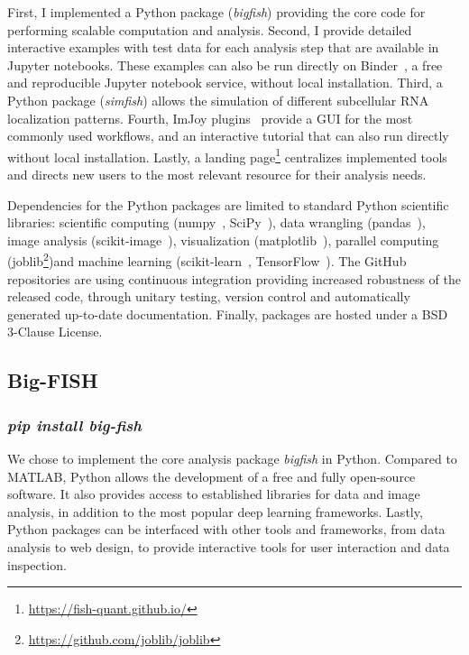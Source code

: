 First, I implemented a Python package (\emph{bigfish}) providing the core code for performing scalable computation and analysis.
Second, I provide detailed interactive examples with test data for each analysis step that are available in Jupyter notebooks.
These examples can also be run directly on Binder~\cite{Jupyter2018Binder2}, a free and reproducible Jupyter notebook service, without local installation.
Third, a Python package (\emph{simfish}) allows the simulation of different subcellular \ac{RNA} localization patterns.
Fourth, ImJoy plugins~\cite{ouyang_imjoy_2019} provide a \ac{GUI} for the most commonly used workflows, and an interactive tutorial that can also run directly without local installation.
Lastly, a landing page\footnote{\url{https://fish-quant.github.io/}} centralizes implemented tools and directs new users to the most relevant resource for their analysis needs.

Dependencies for the Python packages are limited to standard Python scientific libraries: scientific computing (numpy~\cite{2020NumPy}, SciPy~\cite{2020SciPy}), data wrangling (pandas~\cite{mckinney_pandas_2010}), image analysis (scikit-image~\cite{walt_scikit-image_2014}), visualization (matplotlib~\cite{hunter_matplotlib_2007}), parallel computing (joblib\footnote{\url{https://github.com/joblib/joblib}})and machine learning (scikit-learn~\cite{pedregosa11a_scikitlearn}, TensorFlow~\cite{tensorflow_2015}).
The GitHub repositories are using continuous integration providing increased robustness of the released code, through unitary testing, version control and automatically generated up-to-date documentation.
Finally, packages are hosted under a BSD 3-Clause License.

\subsection{Big-FISH}
\label{subsec:bigfish}

\subsubsection{\emph{pip install big-fish}}

We chose to implement the core analysis package \emph{bigfish} in Python.
Compared to MATLAB, Python allows the development of a free and fully open-source software.
It also provides access to established libraries for data and image analysis, in addition to the most popular deep learning frameworks.
Lastly, Python packages can be interfaced with other tools and frameworks, from data analysis to web design, to provide interactive tools for user interaction and data inspection.

